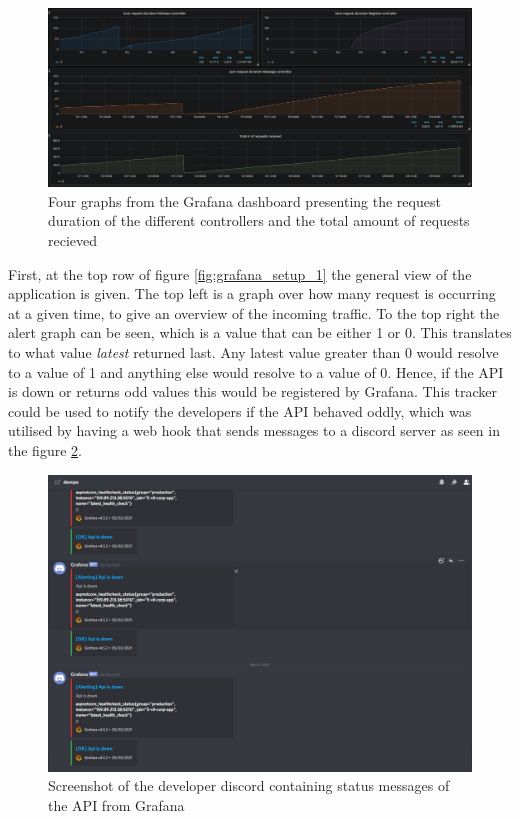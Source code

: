 \documentclass[report/main.tex]{subfiles}
\begin{document}
            \begin{figure}[H]
                \centering
                \includegraphics[width=\textwidth]{report/images/Grafana EvilTwitter 2.jpg}
                \caption{Four graphs from the Grafana dashboard presenting the request duration of the different controllers and the total amount of requests recieved}
                \label{fig:grafana_setup_2}
            \end{figure}
            
            First, at the top row of figure \ref{fig:grafana_setup_1} the general view of the application is given. The top left is a graph over how many request is occurring at a given time, to give an overview of the incoming traffic. To the top right the alert graph can be seen, which is a value that can be either 1 or 0. This translates to what value \textit{latest} returned last. Any latest value greater than 0 would resolve to a value of 1 and anything else would resolve to a value of 0. Hence, if the API is down or returns odd values this would be registered by Grafana. This tracker could be used to notify the developers if the API behaved oddly, which was utilised by having a web hook that sends messages to a discord server as seen in the figure \ref{fig:grafana_discord_alert}.
                
            \begin{figure}[H]
                \centering
                \includegraphics[width=\textwidth]{report/images/Grafana Discord Alert.jpg}
                \caption{Screenshot of the developer discord containing status messages of the API from Grafana}
                \label{fig:grafana_discord_alert}
            \end{figure}
            
\end{document}
